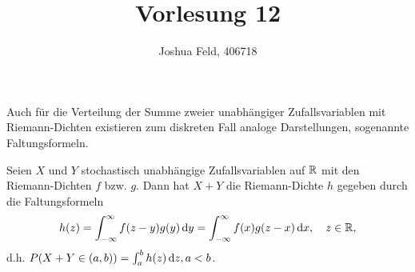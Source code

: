 \documentclass{lecture}
\institute{Institut für Statistik und Wirtschaftsmathematik}
\title{Vorlesung 12}
\author{Joshua Feld, 406718}
\begin{document}
    \maketitle


    Auch für die Verteilung der Summe zweier unabhängiger Zufallsvariablen mit Riemann-Dichten existieren zum diskreten Fall analoge Darstellungen, sogenannte Faltungsformeln.

    \begin{theorem}
        Seien \(X\) und \(Y\) stochastisch unabhängige Zufallsvariablen auf \(\mathbb{R}\) mit den Riemann-Dichten \(f\) bzw. \(g\).
        Dann hat \(X + Y\) die Riemann-Dichte \(h\) gegeben durch die Faltungsformeln
        \[
            h\parentheses*{z} = \int_{-\infty}^\infty f\parentheses*{z - y}g\parentheses*{y}\d y = \int_{-\infty}^\infty f\parentheses*{x}g\parentheses*{z - x}\d x, \quad z \in \R,
        \]
        d.h. \(P\parentheses*{X + Y \in \parentheses*{a, b}} = \int_a^b h\parentheses*{z}\d z, a < b\).
    \end{theorem}
\end{document}
